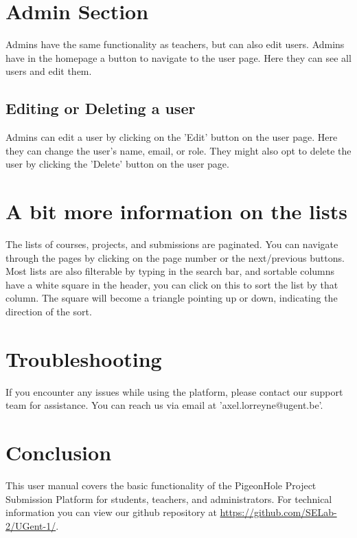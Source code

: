 \documentclass{article}
\begin{document}
\section{Admin Section}

Admins have the same functionality as teachers, but can also edit users. Admins have in the homepage a button to navigate to the user page. Here they can see all users and edit them.

\subsection{Editing or Deleting a user}
Admins can edit a user by clicking on the 'Edit' button on the user page. Here they can change the user's name, email, or role. They might also opt to delete the user by clicking the 'Delete' button on the user page.

\section{A bit more information on the lists}
The lists of courses, projects, and submissions are paginated. You can navigate through the pages by clicking on the page number or the next/previous buttons.
Most lists are also filterable by typing in the search bar, and sortable columns have a white square in the header, you can click on this to sort the list by that column.
The square will become a triangle pointing up or down, indicating the direction of the sort.

\section{Troubleshooting}
If you encounter any issues while using the platform, please contact our support team for assistance. You can reach us via email at 'axel.lorreyne@ugent.be'.

\section{Conclusion}
This user manual covers the basic functionality of the PigeonHole Project Submission Platform for students, teachers, and administrators. For technical information you can view our github repository at \url{https://github.com/SELab-2/UGent-1/}.
\end{document}
